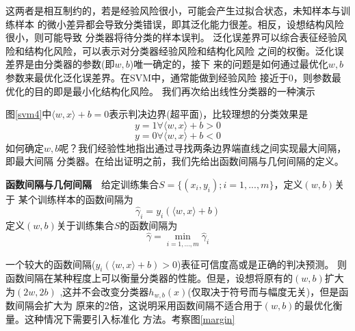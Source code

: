 这两者是相互制约的，若是经验风险很小，可能会产生过拟合状态，未知样本与训练样本
的微小差异都会导致分类错误，即其泛化能力很差。相反，设想结构风险很小，则可能导致
分类器将待分类的样本误判。
泛化误差界可以综合表征经验风险和结构化风险，可以表示对分类器经验风险和结构化风险
之间的权衡。泛化误差界是由分类器的参数(即$w,b$)唯一确定的，接下
来的问题是如何通过最优化$w,b$参数来最优化泛化误差界。在SVM中，通常能做到经验风险
接近于0，则参数最优化的目的即是最小化结构化风险。
我们再次给出线性分类器的一种演示

图\ref{svm4}中$\langle{}w,x\rangle+b=0$表示判决边界(超平面)，比较理想的分类效果是
\begin{equation}
    y=1\forall\langle{}w,x\rangle+b>0
\end{equation}
\begin{equation}
    y=0\forall\langle{}w,x\rangle+b<0
\end{equation}
如何确定$w,b$呢？我们经验性地指出通过寻找两条边界端直线之间实现最大间隔，即最大间隔
分类器。在给出证明之前，我们先给出函数间隔与几何间隔的定义。

\textbf{函数间隔与几何间隔}~~给定训练集合$S=\{(x_i,y_i);i=1,...,m\}$，定义$(w,b)$关于
某个训练样本的函数间隔为
\begin{equation}
    \hat{\gamma}_i=y_i(\langle{}w,x\rangle+b)
\end{equation}
定义$(w,b)$关于训练集合$S$的函数间隔为
\begin{equation}
    \hat{\gamma}=\min_{i=1,...,m}\hat{\gamma}_i
\end{equation}

一个较大的函数间隔($y_i(\langle{}w,x\rangle+b)>0$)表征可信度高或是正确的判决预测。
则函数间隔在某种程度上可以衡量分类器的性能。但是，设想将原有的$(w,b)$扩大为$(2w,2b)$
,这并不会改变分类器$h_{w,b}(x)$(仅取决于符号而与幅度无关)，但是函数间隔会扩大为
原来的2倍，这说明采用函数间隔不适合用于$(w,b)$的最优化衡量。这种情况下需要引入标准化
方法。考察图\ref{margin}

